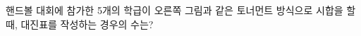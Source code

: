 \noindent\begin{minipage}[t]{0.58\linewidth}\vspace{0pt}\raggedright 핸드볼 대회에 참가한 5개의 학급이 오른쪽 그림과 같은 토너먼트 방식으로 시합을 할 때, 대진표를 작성하는 경우의 수는?\end{minipage}\hfill\begin{minipage}[t]{0.4\linewidth}\vspace{0pt}\centering \resizebox{\ifdim\width>\linewidth\linewidth\else\width\fi}{!}{}\end{minipage}\par
{}
